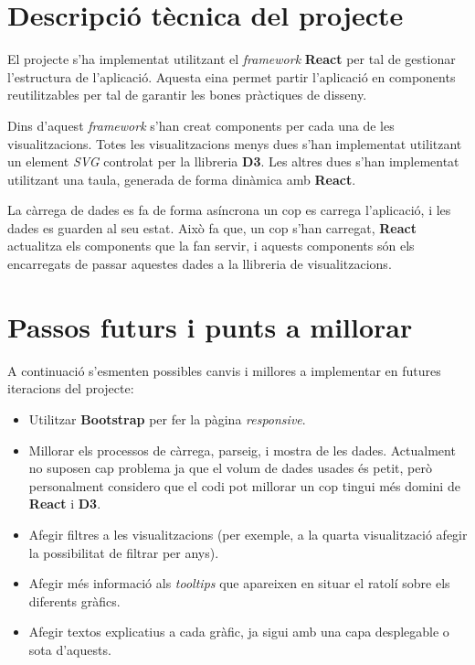 \documentclass{article}
\begin{document}
\section{Descripció tècnica del projecte}
El projecte s'ha implementat utilitzant el \textit{framework} \textbf{React} per
tal de gestionar l'estructura de l'aplicació. Aquesta eina permet partir
l'aplicació en components reutilitzables per tal de garantir les bones pràctiques
de disseny.

Dins d'aquest \textit{framework} s'han creat components per cada una de les
visualitzacions. Totes les visualitzacions menys dues s'han implementat
utilitzant un element \textit{SVG} controlat per la llibreria \textbf{D3}. Les
altres dues s'han implementat utilitzant una taula, generada de forma dinàmica
amb \textbf{React}.

La càrrega de dades es fa de forma asíncrona un cop es carrega l'aplicació, i
les dades es guarden al seu estat. Això fa que, un cop s'han carregat,
\textbf{React} actualitza els components que la fan servir, i aquests components
són els encarregats de passar aquestes dades a la llibreria de visualitzacions.

\section{Passos futurs i punts a millorar}
A continuació s'esmenten possibles canvis i millores a implementar en futures
iteracions del projecte:

\begin{itemize}
    \item Utilitzar \textbf{Bootstrap} per fer la pàgina \textit{responsive}.
    \item Millorar els processos de càrrega, parseig, i mostra de les dades.
        Actualment no suposen cap problema ja que el volum de dades usades és
        petit, però personalment considero que el codi pot millorar un cop
        tingui més domini de \textbf{React} i \textbf{D3}.
    \item Afegir filtres a les visualitzacions (per exemple, a la quarta
        visualització afegir la possibilitat de filtrar per anys).
    \item Afegir més informació als \textit{tooltips} que apareixen en situar
        el ratolí sobre els diferents gràfics.
    \item Afegir textos explicatius a cada gràfic, ja sigui amb una capa
        desplegable o sota d'aquests.
\end{itemize}
\end{document}
